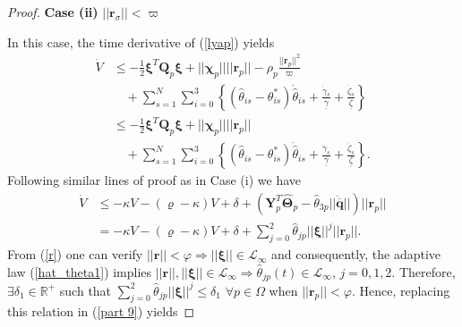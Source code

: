 \documentclass[AMA,STIX1COL,sort, compress]{WileyNJD-v2}
\begin{document}
\begin{proof}
	\noindent\textbf{Case (ii)} $|| \mathbf{r}_\sigma || < \varpi$
	
	In this case, the time derivative of (\ref{lyap}) yields
	\begin{align}
	\dot{V} &\leq -\frac{1}{2} \boldsymbol{\xi}^T \mathbf Q_p\boldsymbol{\xi} + || \boldsymbol \chi_{p}  || || \mathbf{r}_p ||  - \rho_p\frac{{|| \mathbf r_p||}^2}{\varpi} \nonumber \\
	& \quad +\sum_{s=1}^{N} \sum_{i=0}^{3}\left \lbrace (\hat{\theta}_{is} -{\theta}_{is}^{*})\dot{\hat{\theta}}_{is}+ \frac{\dot{\gamma}_{s}}{\underline{\gamma}}+\frac{\dot{\zeta}_{s}}{\underline{\zeta}} \right \rbrace \\%
	& \leq  - \frac{1}{2} \boldsymbol{\xi}^T \mathbf Q_p\boldsymbol{\xi} + || \boldsymbol \chi_{p}  || || \mathbf{r}_p ||  \nonumber\\
	& \quad +\sum_{s=1}^{N} \sum_{i=0}^{3}\left \lbrace (\hat{\theta}_{is} -{\theta}_{is}^{*})\dot{\hat{\theta}}_{is}+ \frac{\dot{\gamma}_{s}}{\underline{\gamma}}+\frac{\dot{\zeta}_{s}}{\underline{\zeta}}\right \rbrace. \label{part 8}
	\end{align}
	Following similar lines of proof as in Case (i) we have
	\begin{align}
	\dot{V} &\leq - \kappa V - (\varrho - \kappa)V + \delta + (\mathbf{Y}^T_p \hat{\boldsymbol \Theta}_p - \hat{\theta}_{3p} || \ddot{\overline{\mathbf q}} ||) || \mathbf{r}_p || \nonumber \\
	& = - \kappa V - (\varrho - \kappa)V + \delta + \sum_{j=0}^{2} \hat{\theta}_{jp}||\boldsymbol \xi ||^j || \mathbf{r}_p || . \label{part 9}
	\end{align}
	From (\ref{r}) one can verify $||\mathbf{r}|| < \varphi \Rightarrow || \boldsymbol \xi || \in \mathcal{L}_{\infty} $ and consequently, the adaptive law (\ref{hat_theta1}) implies $||\mathbf{r}|| , || \boldsymbol \xi || \in \mathcal{L}_{\infty} \Rightarrow \hat{\theta}_{jp} (t) \in \mathcal{L}_{\infty}$, $j=0,1,2$. Therefore, $\exists \delta_1 \in \mathbb{R}^{+}$ such that $\sum_{j=0}^{2} \hat{\theta}_{jp}||\boldsymbol \xi ||^j \leq \delta_1$ $\forall p \in \Omega$ when $||\mathbf r_{p}|| < \varphi$. Hence, replacing this relation in (\ref{part 9}) yields 

\end{proof}
\end{document}
